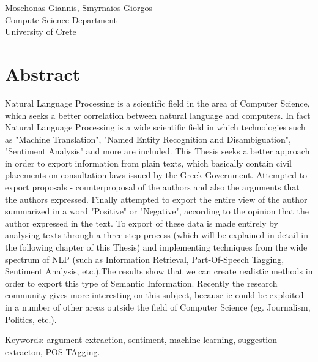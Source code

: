 Moschonas Giannis, Smyrnaios Giorgos\\
Compute Science Department\\
University of Crete \setlength{\parskip}{0.5cm}

\thispagestyle{plain}			%
\setlength{\parskip}{0pt plus 1.0pt}
\section*{Abstract}
Natural Language Processing is a scientific field in the area of Computer Science, which seeks a better correlation between natural language and computers. In fact Natural Language Processing is a wide scientific field in which technologies such as "Machine Translation", "Named Entity Recognition and Disambiguation", "Sentiment Analysis" and more are included. This Thesis seeks a better approach in order to export information from plain texts, which basically contain civil placements on consultation laws issued by the Greek Government. Attempted to export proposals - counterproposal of the authors and also the arguments that the authors expressed. Finally attempted to export the entire view of the author summarized in a word "Positive" or "Negative", according to the opinion that the author expressed in the text. To export of these data is made entirely by analysing texts through a three step process (which will be explained in detail in the following chapter of this Thesis) and implementing techniques from the wide spectrum of NLP (such as Information Retrieval, Part-Of-Speech Tagging, Sentiment Analysis, etc.).The results show that we can create realistic methods in order to export this type of Semantic Information. Recently the research community gives more interesting on this subject, because ic could be exploited in a number of other areas outside the field of Computer Science (eg. Journalism, Politics, etc.).





\vfill
Keywords: argument extraction, sentiment, machine learning, suggestion extracton, POS TAgging.

\newpage				%
\thispagestyle{empty}
\mbox{}